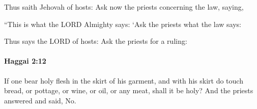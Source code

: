 			\begin{versebox}
					\item[BHS] 
					\item[LXX] 
					\item[ASV] Thus saith Jehovah of hosts: Ask now the priests concerning the law, saying,
					\item[NIV] “This is what the LORD Almighty says: ‘Ask the priests what the law says:
					\item[NRSV] Thus says the LORD of hosts: Ask the priests for a ruling:
			\end{versebox}

		\paragraph{Haggai 2:12} %
			\label{HAGGAI-2-12}

			If one bear holy flesh in the skirt of his garment, and with his skirt do touch bread, or pottage, or wine, or oil, or any meat, shall it be holy? And the priests answered and said, No.

